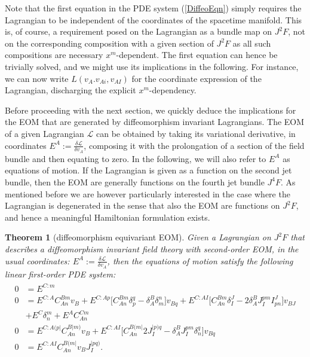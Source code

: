 \documentclass[a4paper,12pt, DIV=14, BCOR=5mm, twoside, headsepline, numbers=noenddot]{scrbook}
\newtheorem{theorem}{Theorem}[section]
\begin{document}
Note that the first equation in the PDE system (\ref{DiffeoEqn}) simply requires the Lagrangian to be independent of the coordinates of the spacetime manifold. This is, of course, a requirement posed on the Lagrangian as a bundle map on $J^2F$, not on the corresponding composition with a given section of $J^2F$ as all such compositions are necessary $x^m$-dependent. The first equation can hence be trivially solved, and we might use its implications in the following. For instance, we can now write $L(v_A.v_{Ai},v_{AI})$ for the coordinate expression of the Lagrangian, discharging the explicit $x^m$-dependency.

Before proceeding with the next section, we quickly deduce the implications for the EOM that are generated by diffeomorphism invariant Lagrangians. The EOM of a given Lagrangian $\mathcal{L}$ can be obtained by taking its variational derivative, in coordinates $E^A := \frac{\delta \mathcal{L}}{\delta v_A}$, composing it with the prolongation of a section of the field bundle and then equating to zero. In the following, we will also refer to $E^A$ as equations of motion. If the Lagrangian is given as a function on the second jet bundle, then the EOM are generally functions on the fourth jet bundle $J^4F$. As mentioned before we are however particularly interested in the case where the Lagrangian is degenerated in the sense that also the EOM are functions on $J^2F$, and hence a meaningful Hamiltonian formulation exists.
\begin{theorem}[diffeomorphism equivariant EOM]
Given a Lagrangian on $J^2F$ that describes a diffeomorphism invariant field theory with second-order EOM, in the usual coordinates: $E^A := \frac{\delta \mathcal{L}}{\delta v_A}$, then the equations of motion satisfy the following linear first-order PDE system:
\begin{align}\label{EOM}
    \begin{aligned}
    0 &= E^{C:m} \\
    0 &= E^{C:A} C_{An}^{Bm} v_B + E^{C:Ap} \bigl[ C_{An}^{Bm} \delta_p^q - \delta_A^B \delta_m^n \bigr] v_{Bq} + E^{C:AI} \bigl[ C_{An}^{Bm} \delta_I^J - 2 \delta_A^B J_I^{pm} I^J_{pn}  \bigr] v_{BJ}\\
    &+ E^C \delta^m_n + E^A C_{An}^{Cm}  \\
    0 &= E^{C:A(p\vert}C_{An}^{B \vert m)} v_B + E^{C: AI} \bigl[ C_{An}^{B(m\vert} 2 J_I^{\vert p) q} - \delta^B_A J_I ^{pm} \delta_n^q \bigr] v_{Bq} \\
    0 &= E^{C:AI} C_{An}^{B(m\vert} v_B J_I^{\vert p q )}.
    \end{aligned}
\end{align}
\end{theorem}
\end{document}
